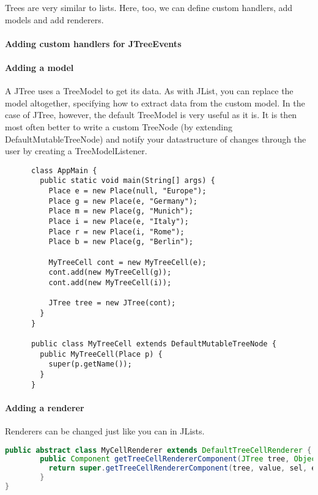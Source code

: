  Trees are very similar to lists. Here, too, we can define custom handlers, add models and add renderers.
 
 \paragraph{Adding custom handlers for JTreeEvents}
 
 \paragraph{Adding a model} A JTree uses a TreeModel to get its data. As with JList, you can replace the model altogether, specifying how to extract data from the custom model. In the case of JTree, however, the default TreeModel is very useful as it is. It is then most often better to write a custom TreeNode (by extending DefaultMutableTreeNode) and notify your datastructure of changes through the user by creating a TreeModelListener.
 
 \begin{lstlisting}
      class AppMain {
        public static void main(String[] args) {
		  Place e = new Place(null, "Europe");
		  Place g = new Place(e, "Germany");
		  Place m = new Place(g, "Munich");
		  Place i = new Place(e, "Italy");
	 	  Place r = new Place(i, "Rome");
		  Place b = new Place(g, "Berlin");
		
		  MyTreeCell cont = new MyTreeCell(e);
		  cont.add(new MyTreeCell(g));
		  cont.add(new MyTreeCell(i));

		  JTree tree = new JTree(cont);
        }
      }
      
      public class MyTreeCell extends DefaultMutableTreeNode {
    	public MyTreeCell(Place p) {
		  super(p.getName());
    	}
      }
 \end{lstlisting}
 
 
 \paragraph{Adding a renderer} Renderers can be changed just like you can in JLists.
 
 \begin{lstlisting}[language=java]
    public abstract class MyCellRenderer extends DefaultTreeCellRenderer {
	    public Component getTreeCellRendererComponent(JTree tree, Object value, boolean sel, boolean expanded, boolean leaf, int row, boolean hasFocus) {
		  return super.getTreeCellRendererComponent(tree, value, sel, expanded, leaf, row, hasFocus);
	    }
}
 \end{lstlisting}
 
